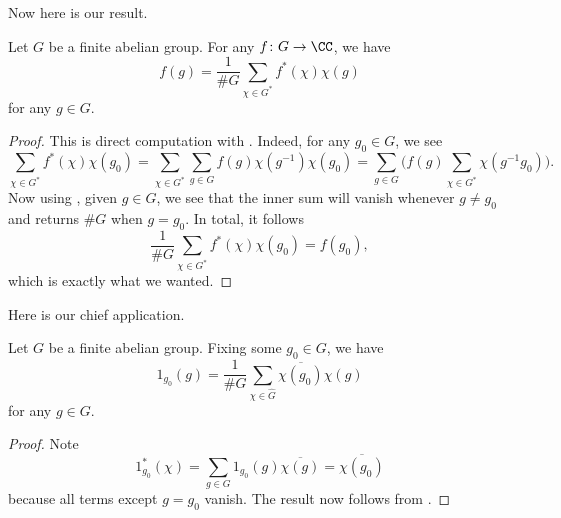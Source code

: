 \documentclass[../notes.tex]{subfiles}
\begin{document}
Now here is our result.
\begin{theorem} \label{thm:fourier-inversion}
	Let $G$ be a finite abelian group. For any $f\colon G\to\CC$, we have
	\[f(g)=\frac1{\#G}\sum_{\chi\in G^*}f^*(\chi)\chi(g)\]
	for any $g\in G$.
\end{theorem}
\begin{proof}
	This is direct computation with . Indeed, for any $g_0\in G$, we see
	\[\sum_{\chi\in G^*}f^*(\chi)\chi(g_0) = \sum_{\chi\in G^*}\sum_{g\in G}f(g)\chi\left(g^{-1}\right)\chi(g_0) = \sum_{g\in G}\Bigg(f(g)\sum_{\chi\in G^*}\chi\left(g^{-1}g_0\right)\Bigg).\]
	Now using , given $g\in G$, we see that the inner sum will vanish whenever $g\ne g_0$ and returns $\#G$ when $g=g_0$. In total, it follows
	\[\frac1{\#G}\sum_{\chi\in G^*}f^*(\chi)\chi(g_0)=f(g_0),\]
	which is exactly what we wanted.
\end{proof}
Here is our chief application.
\begin{corollary}
	Let $G$ be a finite abelian group. Fixing some $g_0\in G$, we have
	\[1_{g_0}(g)=\frac1{\#G}\sum_{\chi\in\widehat G}\overline{\chi(g_0)}\chi(g)\]
	for any $g\in G$.
\end{corollary}
\begin{proof}
	Note
	\[1_{g_0}^*(\chi)=\sum_{g\in G}1_{g_0}(g)\overline{\chi(g)}=\overline{\chi(g_0)}\]
	because all terms except $g=g_0$ vanish. The result now follows from .
\end{proof}
\end{document}
